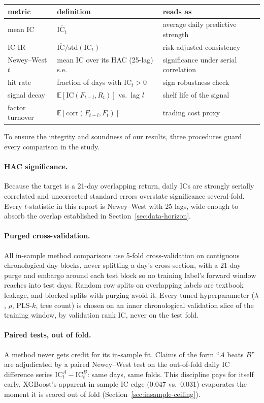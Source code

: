 \documentclass[11pt]{article}
\newcommand{\ic}{\mathrm{IC}}
\begin{document}
\begin{center}
\small
\begin{tabular}{lll}
\toprule
metric & definition & reads as \\
\midrule
mean IC & $\overline{\ic_t}$ & average daily predictive strength \\
IC-IR & $\overline{\ic}/\mathrm{std}(\ic_t)$ & risk-adjusted consistency \\
Newey--West $t$ & mean IC over its HAC (25-lag) s.e. & significance under serial correlation \\
hit rate & fraction of days with $\ic_t>0$ & sign robustness check \\
signal decay & $\mathbb{E}[\ic(F_{t-l},R_t)]$ vs.\ lag $l$ & shelf life of the signal \\
factor turnover & $\mathbb{E}[\mathrm{corr}(F_{t-l},F_t)]$ & trading cost proxy \\
\bottomrule
\end{tabular}
\end{center}

To ensure the integrity and soundness of our results, three procedures guard every
comparison in the study.

\paragraph{HAC significance.} Because the target is a 21-day overlapping return, daily ICs
are strongly serially correlated and uncorrected standard errors overstate significance
several-fold. Every $t$-statistic in this report is Newey--West with 25 lags, wide enough to
absorb the overlap established in Section~\ref{sec:data-horizon}.

\paragraph{Purged cross-validation.} All in-sample method comparisons use 5-fold
cross-validation on contiguous chronological day blocks, never splitting a day's
cross-section, with a 21-day purge and embargo around each test block so no training label's
forward window reaches into test days. Random row splits on overlapping labels are textbook
leakage, and blocked splits with purging avoid it. Every tuned hyperparameter
($\lambda$, $\rho$, PLS-$k$, tree count) is chosen on an inner chronological
validation slice of the training window, by validation rank IC, never on the test fold.

\paragraph{Paired tests, out of fold.} A method never gets credit for its in-sample fit.
Claims of the form ``$A$ beats $B$'' are adjudicated by a paired Newey--West test on the
out-of-fold daily IC difference series $\ic^A_t - \ic^B_t$: same days, same folds.
This discipline pays for itself early. XGBoost's apparent in-sample IC edge (0.047 vs.\
0.031) evaporates the moment it is scored out of fold
(Section~\ref{sec:insample-ceiling}).
\end{document}
